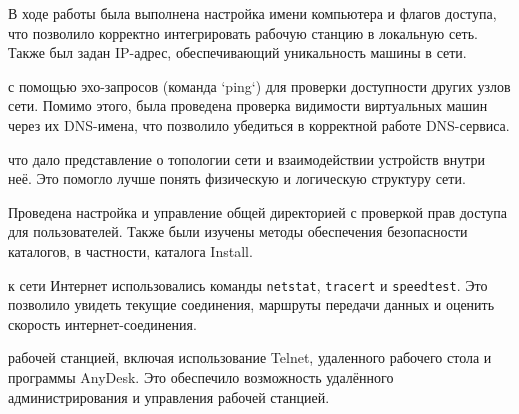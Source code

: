 В ходе работы была выполнена настройка имени компьютера и флагов доступа,
что позволило корректно интегрировать рабочую станцию в локальную сеть.
Также был задан IP-адрес, обеспечивающий уникальность машины в сети.\par
с помощью эхо-запросов (команда `ping`)
для проверки доступности других узлов сети.
Помимо этого, была проведена проверка видимости виртуальных машин через
их DNS-имена, что позволило убедиться в корректной работе DNS-сервиса.\par
что дало представление о топологии сети и взаимодействии устройств внутри неё.
Это помогло лучше понять физическую и логическую структуру сети.\par
Проведена настройка и управление общей директорией
с проверкой прав доступа для пользователей.
Также были изучены методы обеспечения безопасности каталогов,
в частности, каталога Install.\par
к сети Интернет использовались команды \texttt{netstat}, \texttt{tracert}
и \texttt{speedtest}. Это позволило увидеть текущие соединения,
маршруты передачи данных и оценить скорость интернет-соединения.\par
рабочей станцией, включая использование Telnet,
удаленного рабочего стола и программы AnyDesk.
Это обеспечило возможность удалённого администрирования
и управления рабочей станцией.

